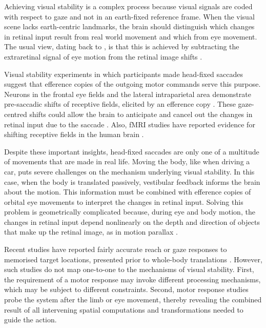 Achieving visual stability is a complex process because visual signals are coded with respect to gaze and not in an earth-fixed reference frame. When the visual scene lacks earth-centric landmarks, the brain should distinguish which changes in retinal input result from real world movement and which from eye movement. The usual view, dating back to \citeauthor{vonhelmholtz1867} \citeyear{vonhelmholtz1867}, is that this is achieved by subtracting the extraretinal signal of eye motion from the retinal image shifts \cite{wexler2005}.

Visual stability experiments in which participants made head-fixed saccades suggest that efference copies of the outgoing motor commands serve this purpose. Neurons in the frontal eye fields and the lateral intraparietal area demonstrate pre-saccadic shifts of receptive fields, elicited by an efference copy \cite{duhamel1992, kusunoki2003}. These gaze-centred shifts could allow the brain to anticipate and cancel out the changes in retinal input due to the saccade \cite{sommer2006}. Also, fMRI studies have reported evidence for shifting receptive fields in the human brain \cite{medendorp2003a}. 

Despite these important insights, head-fixed saccades are only one of a multitude of movements that are made in real life. Moving the body, like when driving a car, puts severe challenges on the mechanism underlying visual stability. In this case, when the body is translated passively, vestibular feedback informs the brain about the motion. This information must be combined with efference copies of orbital eye movements to interpret the changes in retinal input. Solving this problem is geometrically complicated because, during eye and body motion, the changes in retinal input depend nonlinearly on the depth and direction of objects that make up the retinal image, as in motion parallax \cite{medendorp2003b}.

Recent studies have reported fairly accurate reach or gaze responses to memorised target locations, presented prior to whole-body translations \cite<see for review:>{klier2008, medendorp2011}. However, such studies do not map one-to-one to the mechanisms of visual stability. First, the requirement of a motor response may invoke different processing mechanisms, which may be subject to different constraints. Second, motor response studies probe the system after the limb or eye movement, thereby revealing the combined result of all intervening spatial computations and transformations needed to guide the action.

